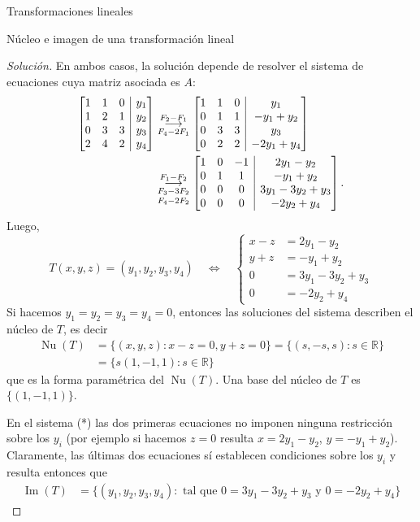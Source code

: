 \documentclass[a4paper,12pt,twoside,spanish,reqno]{amsbook}
\numberwithin{equation}{section}
\theoremstyle{definition}
\theoremstyle{remark}
\newcommand{\img}{\operatorname{Im}}
\newcommand{\nuc}{\operatorname{Nu}}
\renewcommand\nu{\operatorname{Nu}}
\newcommand{\R}{\mathbb R}
\begin{document}
\begin{chapter}{Transformaciones lineales}
\begin{section}{Núcleo e imagen de una transformación lineal}
\begin{proof}[Solución]
    En  ambos casos, la solución depende de resolver el sistema de ecuaciones cuya matriz asociada es $A$:
    \begin{align*}
    \left[\begin{array}{@{}*{3}{c}|c@{}}1&1&0&y_1\\1&2&1&y_2\\0&3&3&y_3\\2&4&2&y_4 \end{array}\right]
    &\underset{F_4-2F_1}{\stackrel{F_2 -F_1}{\longrightarrow}} 
    \left[\begin{array}{@{}*{3}{c}|c@{}}1&1&0&y_1\\0&1&1&-y_1+y_2\\0&3&3&y_3\\0&2&2&-2y_1 +y_4 \end{array}\right]\\
    &\underset{F_4-2F_2}{\underset{F_3-3F_2}{\stackrel{F_1 -F_2}{\longrightarrow}} } 
    \left[\begin{array}{@{}*{3}{c}|c@{}}1&0&-1&2y_1-y_2\\0&1&1&-y_1+y_2\\0&0&0&3y_1-3y_2+y_3\\0&0&0&-2y_2 +y_4 \end{array}\right].
    \end{align*}
Luego, 
    \begin{equation*}\label{eq-gen}
    T(x,y,z) = (y_1,y_2,y_3,y_4) \quad\Leftrightarrow \quad
    \left\{\begin{array}{rl}
    x -z &= 2y_1-y_2\\ 
    y +z &= -y_1+y_2\\
    0&=3y_1-3y_2+y_3 \\
    0&= -2y_2 +y_4
    \end{array}\right.\tag{*}
    \end{equation*}
    Si hacemos $y_1 = y_2 = y_3 = y_4 = 0$, entonces las soluciones del sistema describen el núcleo de $T$, es decir
    \begin{align*}
    \nuc(T) &= \{(x,y,z):x-z=0, y+z =0 \} = \{(s,-s,s):s \in \R \} \\
    &= \{s(1,-1,1):s \in \R \}
    \end{align*}
    que es la forma paramétrica del $\nu(T)$. Una base del núcleo de $T$  es $\{(1,-1,1)\}$. 


    En  el sistema (*) las dos primeras ecuaciones no imponen ninguna restricción sobre los $y_i$ (por ejemplo si hacemos $z=0$ resulta $x = 2y_1-y_2$,  $y= -y_1+y_2$). Claramente, las últimas dos ecuaciones sí establecen condiciones sobre los $y_i$ y resulta entonces que   
    \begin{align*}
        \img(T) &=  \{(y_1,y_2,y_3,y_4): \text{ tal que $0=3y_1-3y_2+y_3$ y $0= -2y_2 +y_4$} \} 
    \end{align*}
    

\end{proof}
\end{section}
\end{chapter}
\end{document}
